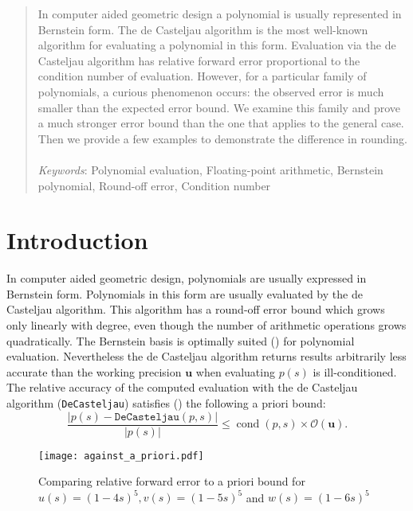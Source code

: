 \documentclass[letterpaper,10pt]{article}
\theoremstyle{definition}
\newcommand{\cond}[1]{\operatorname{cond}\left(#1\right)}
\newcommand{\bigO}[1]{\mathcal{O}\left(#1\right)}
\newcommand{\mach}{\mathbf{u}}
\begin{document}
\begin{abstract}
\noindent  In computer aided geometric design a polynomial is usually
represented in Bernstein form. The de Casteljau algorithm is the most
well-known algorithm for evaluating a polynomial in this form. Evaluation
via the de Casteljau algorithm has relative forward error proportional to
the condition number of evaluation. However, for a particular family of
polynomials, a curious phenomenon occurs: the observed error is much smaller
than the expected error bound. We examine this family and prove a much
stronger error bound than the one that applies to the general case. Then
we provide a few examples to demonstrate the difference in rounding.
\\ \\
\noindent \textit{Keywords}: Polynomial evaluation, Floating-point
arithmetic, Bernstein polynomial, Round-off error, Condition number
\end{abstract}

\tableofcontents

\section{Introduction}

In computer aided geometric design, polynomials are usually expressed in
Bernstein form. Polynomials in this form are usually evaluated by the
de Casteljau algorithm. This algorithm has a round-off error bound
which grows only linearly with degree, even though the number of
arithmetic operations grows quadratically. The Bernstein basis is
optimally suited (\cite{Farouki1987, Delgado2015, Mainar2005})
for polynomial evaluation. Nevertheless the de Casteljau
algorithm returns results arbitrarily less accurate than the working
precision \(\mach\) when evaluating \(p(s)\) is ill-conditioned.
The relative accuracy of the computed
evaluation with the de Casteljau algorithm (\texttt{DeCasteljau}) satisfies
(\cite{Mainar1999}) the following a priori bound:
\begin{equation}\label{de-casteljau-error}
  \frac{\left|p(s) - \mathtt{DeCasteljau}(p, s)\right|}{\left|p(s)\right|} \leq
  \cond{p, s} \times \bigO{\mach}.
\end{equation}

\begin{figure}
  \texttt{[image: against\_a\_priori.pdf]}
  \centering
  \captionsetup{width=.75\linewidth}
  \caption{Comparing relative forward error to a priori bound for
    \(u(s) = (1 - 4s)^5, v(s) = (1 - 5s)^5\) and \(w(s) = (1 - 6s)^5\)}
  \label{fig:against-a-priori}
\end{figure}
\end{document}
